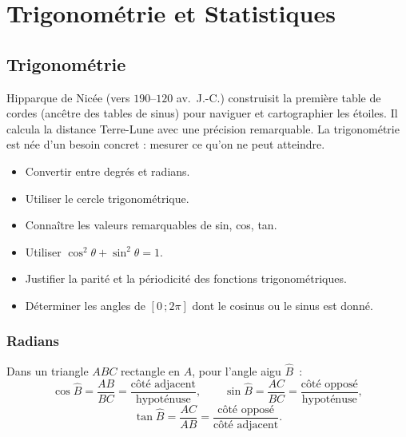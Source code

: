 \part{Trigonom\'etrie et Statistiques}

\chapter{Trigonom\'etrie}
\label{chap:trigonometrie}


\begin{anecdote}
Hipparque de Nic\'ee (vers $190$--$120$ av.\ J.-C.) construisit la premi\`ere
table de cordes (anc\^{e}tre des tables de sinus) pour naviguer et cartographier
les \'etoiles. Il calcula la distance Terre-Lune avec une pr\'ecision remarquable.
La trigonom\'etrie est n\'ee d'un besoin concret : mesurer ce qu'on ne peut atteindre.
\end{anecdote}

\begin{objectifs}
\begin{itemize}
  \item Convertir entre degr\'es et radians.
  \item Utiliser le cercle trigonom\'etrique.
  \item Conna\^itre les valeurs remarquables de sin, cos, tan.
  \item Utiliser $\cos^2\theta + \sin^2\theta = 1$.
  \item Justifier la parit\'e et la p\'eriodicit\'e des fonctions trigonom\'etriques.
  \item D\'eterminer les angles de $[0\,;2\pi]$ dont le cosinus ou le sinus est donn\'e.
\end{itemize}
\end{objectifs}

\section{Radians}

\begin{prop}
Dans un triangle $ABC$ rectangle en $A$, pour l'angle aigu $\widehat{B}$~:
$$\cos\widehat B=\frac{AB}{BC}=\frac{\text{c\^ot\'e adjacent}}{\text{hypot\'enuse}},\qquad
  \sin\widehat B=\frac{AC}{BC}=\frac{\text{c\^ot\'e oppos\'e}}{\text{hypot\'enuse}},$$
$$\tan\widehat B=\frac{AC}{AB}=\frac{\text{c\^ot\'e oppos\'e}}{\text{c\^ot\'e adjacent}}.$$
\end{prop}

